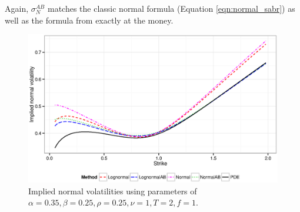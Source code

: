 \documentclass[]{rAMF2e}
\begin{document}
Again, $\sigma_N^{AB}$ matches the classic normal formula (Equation \ref{eqn:normal_sabr}) as well as the formula from \citep{hagan2002managing} exactly at the money.
\begin{figure}[h]
  \caption{\label{fig:ab_global_derivative_normal}Implied normal volatilities using parameters of \citep{hagan2014arbitragetalk} $\alpha= 0.35, \beta=0.25, \rho=0.25, \nu=1, T=2, f=1$.}
\begin{center}
 \includegraphics[width=14cm]{ab_global_derivative_normal.eps}
\end{center}
\end{figure}
\end{document}
